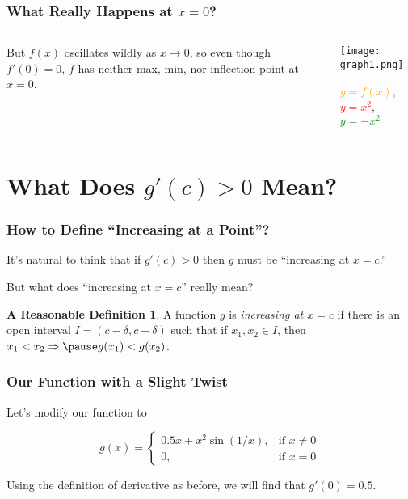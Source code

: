 \documentclass{beamer} %
\theoremstyle{definition} %
\newtheorem*{dfn}{A Reasonable Definition}
\begin{document}
\begin{frame}
\frametitle{What Really Happens at $x=0$?}
\begin{columns} %
\begin{column}{0.5\textwidth} %
But $f(x)$ oscillates wildly as $x\to 0$, so even though $f'(0)=0$, $f$ has neither max, min, nor inflection point at $x=0$.
\end{column}

\pause

\begin{column}{0.5\textwidth} %
\texttt{[image: graph1.png]} %
\begin{center}
\textcolor{orange}{$y=f(x)$}, \textcolor{red}{$y=x^2$}, \textcolor{green}{$y=-x^2$} %
\end{center}
\end{column}
\end{columns}
\end{frame}

\section{What Does $g'(c)>0$ Mean?} %

\begin{frame}
\frametitle{How to Define ``Increasing at a Point''?}
It's natural to think that if $g'(c)>0$ then $g$ must be ``increasing at $x=c$.'' 

\pause But what does ``increasing at $x=c$'' really mean?

\pause \begin{dfn} %
A function $g$ is \emph{increasing at $x=c$} if there is an open interval $I=(c-\delta,c+\delta)$ such that \pause if $x_1, x_2\in I$, \pause then $x_1<x_2\Rightarrow \pause g(x_1)<g(x_2)$.
\end{dfn}
\end{frame}

\begin{frame}
\frametitle{Our Function with a Slight Twist}
Let's modify our function to 

$$ g(x)=
\begin{cases}
0.5x+x^2\sin(1/x), &\text{if }x\neq0 \\
0, &\text{if }x=0
\end{cases}
$$

Using the definition of derivative as before, we will find that $g'(0)=0.5$. 
\end{frame}
\end{document}
